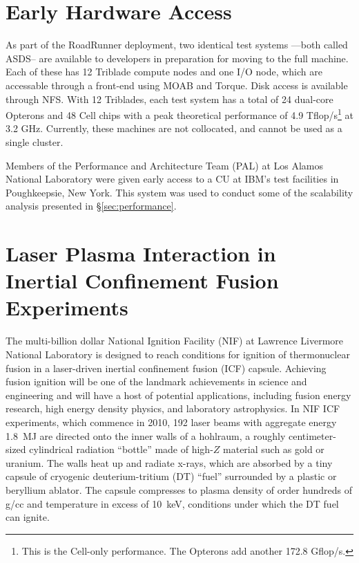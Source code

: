 \documentclass[letter,10pt]{article}
\begin{document}
\section*{Early Hardware Access}

As part of the RoadRunner deployment, two identical test systems ---both called ASDS-- are available to developers in preparation for moving to the full machine.  Each of these has 12 Triblade compute nodes and one I/O node, which are accessable through a front-end using MOAB and Torque.  Disk access is available through NFS.  With 12 Triblades, each test system has a total of 24 dual-core Opterons and 48 Cell chips with a peak theoretical performance of 4.9 Tflop/s\footnote{This is the Cell-only performance.  The Opterons add another 172.8 Gflop/s.} at 3.2 GHz.  Currently, these machines are not collocated, and cannot be used as a single cluster.

Members of the Performance and Architecture Team (PAL) at Los Alamos National Laboratory were given early access to a CU at IBM's test facilities in Poughkeepsie, New York.  This system was used to conduct some of the scalability analysis presented in \S \ref{sec:performance}.

\section*{Laser Plasma Interaction in Inertial Confinement Fusion Experiments}

The multi-billion dollar National Ignition Facility (NIF) at 
Lawrence Livermore National Laboratory
is designed to reach conditions for ignition of thermonuclear fusion in a 
laser-driven inertial confinement fusion (ICF) capsule.  Achieving fusion ignition 
will be one of the landmark achievements in science and engineering and will
have a host of potential applications, including fusion energy research, 
high energy density physics, and laboratory astrophysics.  
In NIF ICF experiments, which commence in 2010, 192 laser beams with aggregate 
energy 1.8~MJ are directed onto the inner walls of a hohlraum, 
a roughly centimeter-sized cylindrical radiation ``bottle'' made of high-$Z$ material 
such as gold or uranium.  The walls heat up and radiate x-rays, which are absorbed 
by a tiny capsule
of cryogenic deuterium-tritium (DT) ``fuel'' surrounded by a plastic or beryllium 
ablator.  The capsule compresses to plasma density of order hundreds of g/cc and 
temperature in excess of 10~keV, conditions under which the DT fuel can ignite. 
\end{document}
